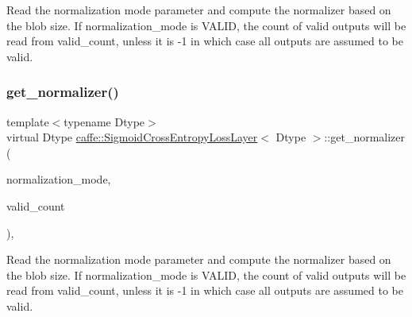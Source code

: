 Read the normalization mode parameter and compute the normalizer based on the blob size. If normalization\+\_\+mode is V\+A\+L\+ID, the count of valid outputs will be read from valid\+\_\+count, unless it is -\/1 in which case all outputs are assumed to be valid. \mbox{\label{classcaffe_1_1_sigmoid_cross_entropy_loss_layer_accab5e6e98e83dec65af0ecb49deb36b}} 
\subsubsection{\texorpdfstring{get\+\_\+normalizer()}{get\_normalizer()}\hspace{0.1cm}{\footnotesize\ttfamily [2/2]}}
{\footnotesize\ttfamily template$<$typename Dtype$>$ \\
virtual Dtype \mbox{\hyperlink{classcaffe_1_1_sigmoid_cross_entropy_loss_layer}{caffe\+::\+Sigmoid\+Cross\+Entropy\+Loss\+Layer}}$<$ Dtype $>$\+::get\+\_\+normalizer (\begin{DoxyParamCaption}\item[{Loss\+Parameter\+\_\+\+Normalization\+Mode}]{normalization\+\_\+mode,  }\item[{int}]{valid\+\_\+count }\end{DoxyParamCaption})\hspace{0.3cm}{\ttfamily [protected]}, {\ttfamily [virtual]}}

Read the normalization mode parameter and compute the normalizer based on the blob size. If normalization\+\_\+mode is V\+A\+L\+ID, the count of valid outputs will be read from valid\+\_\+count, unless it is -\/1 in which case all outputs are assumed to be valid. \mbox{\label{classcaffe_1_1_sigmoid_cross_entropy_loss_layer_ac67af0cc1033db08d47a3f56aff5d600}} 
